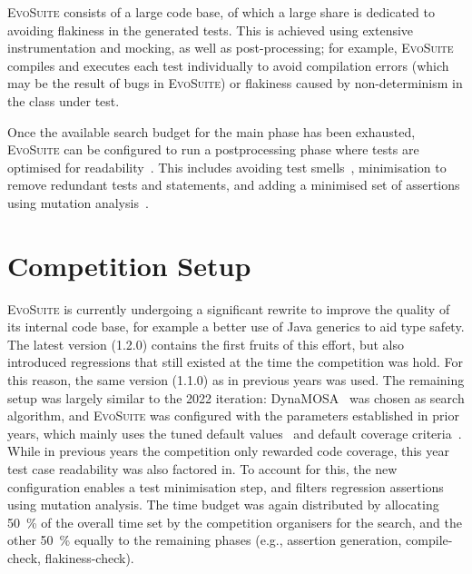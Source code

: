 \documentclass[10pt,conference]{IEEEtran}
\newcommand{\EVOSUITE}{\textsc{EvoSuite}\xspace}
\begin{document}
\EVOSUITE consists of a large code base, of which a large share is
dedicated to avoiding flakiness in the generated tests. This is
achieved using extensive instrumentation and mocking, as well as
post-processing; for example, \EVOSUITE compiles and executes each
test individually to avoid compilation errors (which may be the result
of bugs in \EVOSUITE) or flakiness caused by non-determinism in the
class under test.

Once the available search budget for the main phase has been exhausted,
\EVOSUITE can be configured to run a postprocessing phase where tests are optimised for
readability~\cite{FrA11c,FrA13a}. This includes avoiding test
smells~\cite{panichella2020revisiting}, minimisation to remove redundant tests
and statements, and adding a minimised set of assertions using mutation
analysis~\cite{10.1109/TSE.2011.93}.


\section{Competition Setup}\label{sec:setup}

\EVOSUITE is currently undergoing a significant rewrite to improve the quality
of its internal code base, for example a better use of Java generics to aid
type safety. The latest version (1.2.0) contains the first fruits of this effort,
but also introduced regressions that still existed at the time the competition was
hold. For this reason, the same version (1.1.0) as in previous years was used.
The remaining setup was largely similar to the 2022 iteration: DynaMOSA~\cite{dynamosa}
was chosen as search algorithm, and \EVOSUITE was configured with the parameters
established in prior years, which mainly uses the tuned default
values~\cite{arcuri2013parameter} and default coverage criteria~\cite{rojas2015combining}.
%
%
While in previous years the competition only rewarded code coverage, this year
test case readability was also factored in. To account for this, the new configuration 
enables a test minimisation step, and filters regression assertions using mutation analysis.
%
The time budget was again distributed by allocating \SI{50}{\percent} of the overall time
set by the competition organisers for the search, and the other \SI{50}{\percent} equally to
the remaining phases (e.g., assertion generation, compile-check, flakiness-check).
\end{document}
